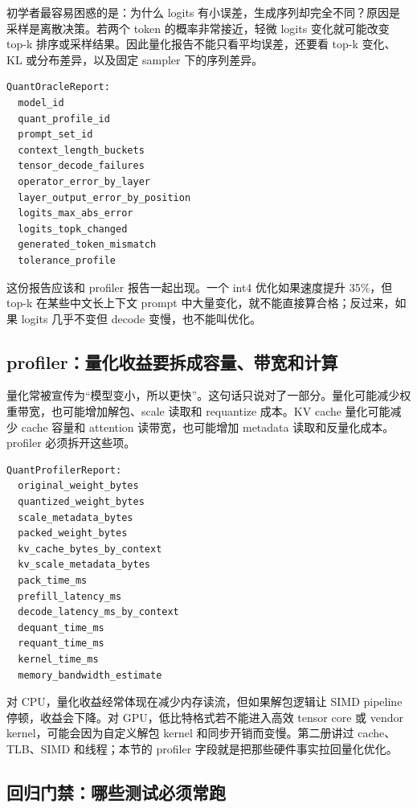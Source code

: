 初学者最容易困惑的是：为什么 logits 有小误差，生成序列却完全不同？原因是采样是离散决策。若两个 token 的概率非常接近，轻微 logits 变化就可能改变 top-k 排序或采样结果。因此量化报告不能只看平均误差，还要看 top-k 变化、KL 或分布差异，以及固定 sampler 下的序列差异。

\begin{lstlisting}[numbers=none,caption={量化 oracle 报告字段}]
QuantOracleReport:
  model_id
  quant_profile_id
  prompt_set_id
  context_length_buckets
  tensor_decode_failures
  operator_error_by_layer
  layer_output_error_by_position
  logits_max_abs_error
  logits_topk_changed
  generated_token_mismatch
  tolerance_profile
\end{lstlisting}

这份报告应该和 profiler 报告一起出现。一个 int4 优化如果速度提升 35\%，但 top-k 在某些中文长上下文 prompt 中大量变化，就不能直接算合格；反过来，如果 logits 几乎不变但 decode 变慢，也不能叫优化。

\subsection{profiler：量化收益要拆成容量、带宽和计算}

量化常被宣传为“模型变小，所以更快”。这句话只说对了一部分。量化可能减少权重带宽，也可能增加解包、scale 读取和 requantize 成本。KV cache 量化可能减少 cache 容量和 attention 读带宽，也可能增加 metadata 读取和反量化成本。profiler 必须拆开这些项。

\begin{lstlisting}[numbers=none,caption={量化 profiler 的关键字段}]
QuantProfilerReport:
  original_weight_bytes
  quantized_weight_bytes
  scale_metadata_bytes
  packed_weight_bytes
  kv_cache_bytes_by_context
  kv_scale_metadata_bytes
  pack_time_ms
  prefill_latency_ms
  decode_latency_ms_by_context
  dequant_time_ms
  requant_time_ms
  kernel_time_ms
  memory_bandwidth_estimate
\end{lstlisting}

对 CPU，量化收益经常体现在减少内存读流，但如果解包逻辑让 SIMD pipeline 停顿，收益会下降。对 GPU，低比特格式若不能进入高效 tensor core 或 vendor kernel，可能会因为自定义解包 kernel 和同步开销而变慢。第二册讲过 cache、TLB、SIMD 和线程；本节的 profiler 字段就是把那些硬件事实拉回量化优化。

\subsection{回归门禁：哪些测试必须常跑}

